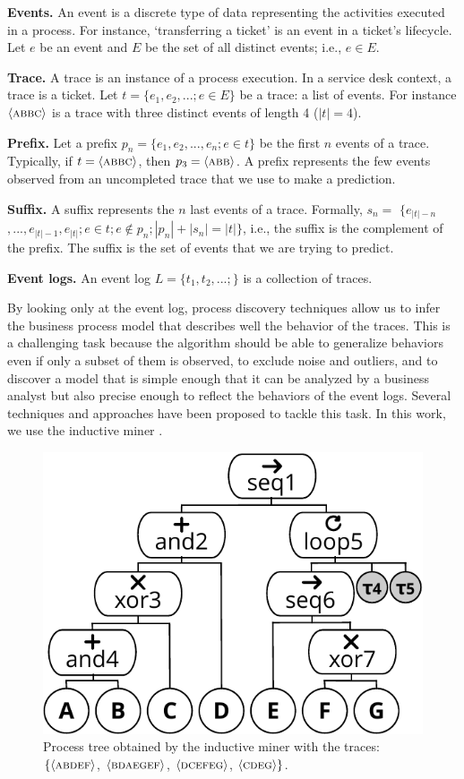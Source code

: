 \documentclass[runningheads]{llncs}
\begin{document}
\textbf{Events.} An event is a discrete type of data representing the activities executed in a process. For instance, ‘transferring a ticket’ is an event in a ticket's lifecycle. Let $e$ be an event and $E$ be the set of all distinct events; i.e., $e \in E$. 

\textbf{Trace.} A trace is an instance of a process execution. In a service desk context, a trace is a ticket. Let $t = \{e_1, e_2, ...; e \in E \}$ be a trace: a list of events. For instance $\langle \textsc{abbc} \rangle$ is a trace with three distinct events of length 4 ($|t|=4$).

\textbf{Prefix.} Let a prefix $p_n = \{e_1, e_2, ..., e_n; e \in t\}$ be the first $n$ events of a trace. Typically, if $t = \langle \textsc{abbc} \rangle$, then $p_3 = \langle \textsc{abb} \rangle$. A prefix represents the few  events observed from an uncompleted trace that we use to make a prediction.

\textbf{Suffix.} A suffix represents the $n$ last events of a trace. Formally, $s_n = $ $\{e_{|t|-n}$ $, ..., e_{|t|-1}, e_{|t|}; e \in t; e \notin p_n; |p_n|+|s_n| = |t|\}$, i.e., the suffix is the complement of the prefix. The suffix is the set of events that we are trying to predict.

\textbf{Event logs.} An event log $L = \{t_1, t_2, ...;\}$ is a collection of traces. 

\vspace{5pt}

By looking only at the event log, process discovery techniques allow us to infer the business process model that describes well the behavior of the traces. This is a challenging task because the algorithm should be able to generalize behaviors even if only a subset of them is observed, to exclude noise and outliers, and to discover a model that is simple enough that it can be analyzed by a business analyst but also precise enough to reflect the behaviors of the event logs. Several techniques and approaches have been proposed to tackle this task. In this work, we use the inductive miner \cite{leemans2013discovering}.


\begin{figure}
\begin{center}
\includegraphics[width=0.35\columnwidth]{02-schema/process_tree.pdf}
\end{center}
\caption{Process tree obtained by the inductive miner with the traces: $\{ \langle \textsc{abdef} \rangle$, $\langle \textsc{bdaegef} \rangle$, $\langle \textsc{\textsc{dcefeg}} \rangle$, $\langle \textsc{cdeg} \rangle \}$.}
\label{process_tree}
\end{figure}
\end{document}
